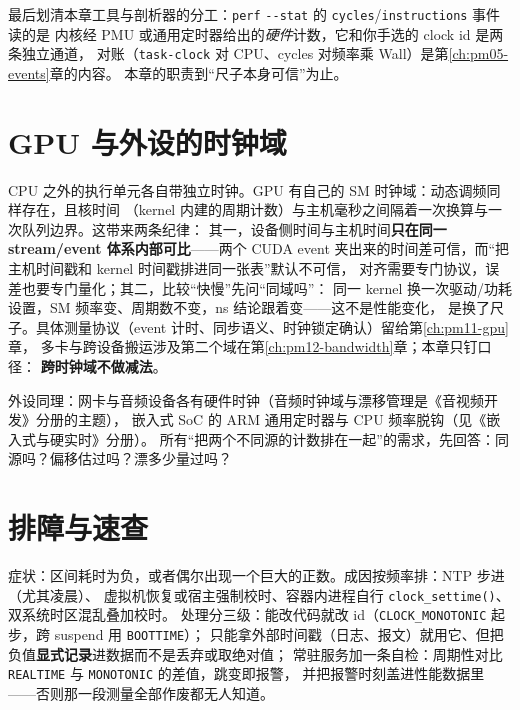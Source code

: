 \documentclass[12pt,a4paper,fontset=fandol]{ctexbook}
\newcommand{\Fn}[1]{\texttt{#1()}}
\newcommand{\Tp}[1]{\texttt{#1}}
\newcommand{\Opt}[1]{\texttt{-\/-#1}}
\newcommand{\Bk}{\discretionary{}{}{}}
\newcommand{\Lang}[1]{\textsf{#1}}
\newcommand{\MWall}{\Lang{Wall}}
\newcommand{\MCpu}{\Lang{CPU}}
\begin{document}
最后划清本章工具与剖析器的分工：\Tp{perf} \Opt{stat} 的 \Tp{cycles}/\Tp{instructions} 事件读的是
内核经 PMU 或通用定时器给出的\emph{硬件}计数，它和你手选的 clock id 是两条独立通道，
对账（\Tp{task-clock} 对 \MCpu、cycles 对频率乘 \MWall）是第\ref{ch:pm05-events}章的内容。
本章的职责到``尺子本身可信''为止。

\section{GPU 与外设的时钟域}
\label{sec:pm02-gpu-domains}

CPU 之外的执行单元各自带独立时钟。GPU 有自己的 SM 时钟域：动态调频同样存在，且核时间
（kernel 内建的周期计数）与主机毫秒之间隔着一次换算与一次队列边界。这带来两条纪律：
其一，设备侧时间与主机时间\textbf{只在同一 stream/event 体系内部可比}——两个 CUDA event
夹出来的时间差可信，而``把主机时间戳和 kernel 时间戳排进同一张表''默认不可信，
对齐需要专门协议，误差也要专门量化；其二，比较``快慢''先问``同域吗''：
同一 kernel 换一次驱动/功耗设置，SM 频率变、周期数不变，ns 结论跟着变——这不是性能变化，
是换了尺子。具体测量协议（event 计时、同步语义、时钟锁定确认）留给第\ref{ch:pm11-gpu}章，
多卡与跨设备搬运涉及第二个域在第\ref{ch:pm12-bandwidth}章；本章只钉口径：
\textbf{跨时钟域不做减法}。

外设同理：网卡与音频设备各有硬件时钟（音频时钟域与漂移管理是《音视频开发》分册的主题），
嵌入式 SoC 的 ARM 通用定时器与 CPU 频率脱钩（见《嵌入式与硬实时》分册）。
所有``把两个不同源的计数排在一起''的需求，先回答：同源吗？偏移估过吗？漂多少量过吗？

\section{排障与速查}
\label{sec:pm02-trouble}

\begin{warning}[title={用 \Tp{CLOCK{\Bk}\_REALTIME} 测出负数耗时}, label={box:pm02-negative}]
症状：区间耗时为负，或者偶尔出现一个巨大的正数。成因按频率排：NTP 步进（尤其凌晨）、
虚拟机恢复或宿主强制校时、容器内进程自行 \Fn{clock{\Bk}\_settime}、双系统时区混乱叠加校时。
处理分三级：能改代码就改 id（\Tp{CLOCK{\Bk}\_MONOTONIC} 起步，跨 suspend 用 \Tp{BOOTTIME}）；
只能拿外部时间戳（日志、报文）就用它、但把负值\textbf{显式记录}进数据而不是丢弃或取绝对值；
常驻服务加一条自检：周期性对比 \Tp{REALTIME} 与 \Tp{MONOTONIC} 的差值，跳变即报警，
并把报警时刻盖进性能数据里——否则那一段测量全部作废都无人知道。
\end{warning}
\end{document}
